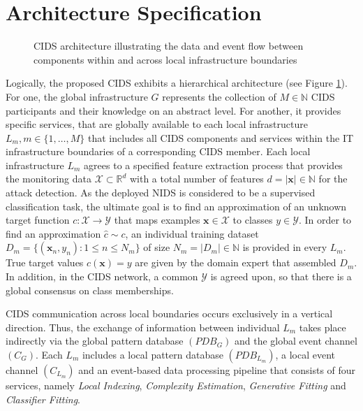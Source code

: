 \documentclass[../../main.tex]{subfiles}
\begin{document}
\section{Architecture Specification} \label{sec:architecture_specification}



\begin{figure}[b!]
    \centering
    
    \caption{CIDS architecture illustrating the data and event flow between components within and across local infrastructure boundaries}
    \label{fig:detailed_architecture}
    \end{figure}

    
    Logically, the proposed CIDS exhibits a hierarchical architecture (see Figure \ref{fig:detailed_architecture}). For one, the global infrastructure $G$ represents the collection of $M \in \mathbb{N}$ CIDS participants and their knowledge on an abstract level. For another, it provides specific services, that are globally available to each local infrastructure $L_m, m \in \{1, \dots, M\}$ that includes all CIDS components and services within the IT infrastructure boundaries of a corresponding CIDS member. Each local infrastructure $L_m$ agrees to a specified feature extraction process that provides the monitoring data $\mathcal{X} \subset \mathbb{R}^d$ with a total number of features $d = |\bm{x}| \in \mathbb{N}$ for the attack detection. As the deployed NIDS is considered to be a supervised classification task, the ultimate goal is to find an approximation of an unknown target function $c: \mathcal{X} \rightarrow \mathcal{Y}$ that maps examples $\bm{x} \in \mathcal{X}$ to classes $y \in \mathcal{Y}$. In order to find an approximation $\hat{c} \sim c$, an individual training dataset $D_m= \{(\bm{x}_n, y_n): 1 \leq n \leq N_m\}$ of size $N_m = |D_m| \in \mathbb{N}$ is provided in every $L_m$. True target values $c(\bm{x}) = y$ are given by the domain expert that assembled $D_m$. In addition, in the CIDS network, a common $\mathcal{Y}$ is agreed upon, so that there is a global consensus on class memberships.
    
    CIDS communication across local boundaries occurs exclusively in a vertical direction. Thus, the exchange of information between individual $L_m$ takes place indirectly via the global pattern database $(PDB_G)$ and the global event channel $(C_G)$. Each $L_m$ includes a local pattern database $(PDB_{L_m})$, a local event channel $(C_{L_m})$ and an event-based data processing pipeline that consists of four services, namely \textit{Local Indexing}, \textit{Complexity Estimation}, \textit{Generative Fitting} and \textit{Classifier Fitting}. 
    
\end{document}
